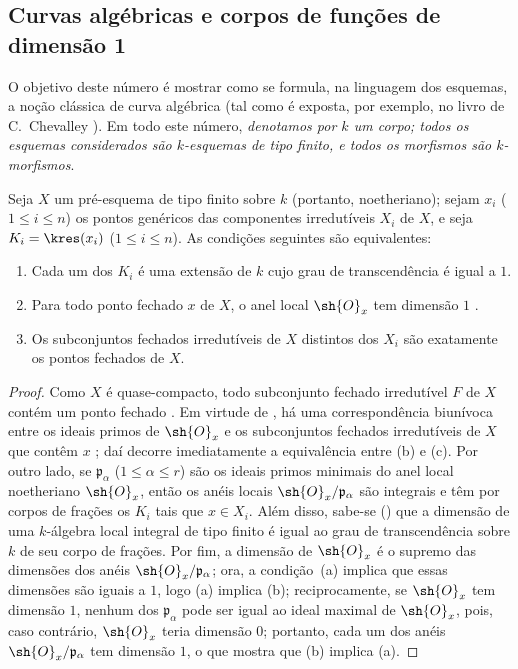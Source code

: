 \documentclass[oneside,10pt]{amsart}
\renewcommand{\leq}{\leqslant}
\newcommand{\oldpage}[2][]{\marginnote{\normalfont\footnotesize\textbf{#1}~|~#2}\ignorespaces}
\let\EGAOriginalLabel\label
\renewcommand{\label}[1]{\phantomsection\EGAOriginalLabel{#1}}
\begin{document}
\oldpage[II]{148}

\subsection{Curvas algébricas e corpos de funções de dimensão 1}
\label{subsection:II.7.4}

O objetivo deste número é mostrar como se formula, na linguagem dos esquemas, a noção clássica de curva algébrica (tal como é exposta, por exemplo, no livro de C.~Chevalley \cite{II-23}).
Em todo este número, \emph{denotamos por $k$ um corpo; todos os esquemas considerados são $k$-esquemas de tipo finito, e todos os morfismos são $k$-morfismos}.

\begin{proposition}[7.4.1]
\label{II.7.4.1}
Seja $X$ um pré-esquema de tipo finito sobre $k$ (portanto, noetheriano);
sejam $x_i$ ($1\leq i\leq n$) os pontos genéricos das componentes irredutíveis $X_i$ de $X$, e seja $K_i=\kres(x_i)$ ($1\leq i\leq n$).
As condições seguintes são equivalentes:
\begin{enumerate}
    \item[\rm{(a)}] Cada um dos $K_i$ é uma extensão de $k$ cujo grau de transcendência é igual a $1$.
    \item[\rm{(b)}] Para todo ponto fechado $x$ de $X$, o anel local $\sh{O}_x$ tem dimensão $1$ .
    \item[\rm{(c)}] Os subconjuntos fechados irredutíveis de $X$ distintos dos $X_i$ são exatamente os pontos fechados de $X$.
\end{enumerate}
\end{proposition}

\begin{proof}
Como $X$ é quase-compacto, todo subconjunto fechado irredutível $F$ de $X$ contém um ponto fechado .
Em virtude de , há uma correspondência biunívoca entre os ideais primos de $\sh{O}_x$ e os subconjuntos fechados irredutíveis de $X$ que contêm $x$ ;
daí decorre imediatamente a equivalência entre (b) e (c).
Por outro lado, se $\mathfrak{p}_\alpha$ ($1\leq\alpha\leq r$) são os ideais primos minimais do anel local noetheriano $\sh{O}_x$, então os anéis locais $\sh{O}_x/\mathfrak{p}_\alpha$ são integrais e têm por corpos de frações os $K_i$ tais que $x\in X_i$.
Além disso, sabe-se (\cite[p.~4-06, th.~2]{I-1}) que a dimensão de uma $k$-álgebra local integral de tipo finito é igual ao grau de transcendência sobre $k$ de seu corpo de frações.
Por fim, a dimensão de $\sh{O}_x$ é o supremo das dimensões dos anéis $\sh{O}_x/\mathfrak{p}_\alpha$;
ora, a condição~(a) implica que essas dimensões são iguais a $1$, logo (a) implica (b);
reciprocamente, se $\sh{O}_x$ tem dimensão $1$, nenhum dos $\mathfrak{p}_\alpha$ pode ser igual ao ideal maximal de $\sh{O}_x$, pois, caso contrário, $\sh{O}_x$ teria dimensão $0$;
portanto, cada um dos anéis $\sh{O}_x/\mathfrak{p}_\alpha$ tem dimensão $1$, o que mostra que (b) implica (a).
\end{proof}
\end{document}
